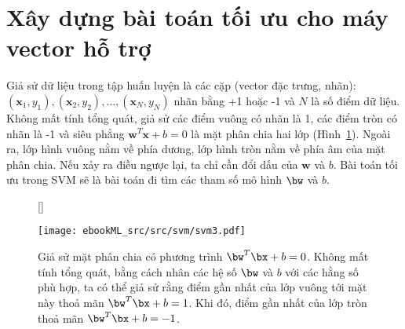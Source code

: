  
\section{Xây dựng bài toán tối ưu cho máy vector hỗ trợ} 
Giả sử dữ liệu trong tập huấn luyện là các cặp (vector đặc trưng, nhãn): $(\mathbf{x}_1, y_1),
(\mathbf{x}_2, y_2), \dots, (\mathbf{x}_N, y_N)$ 
{nhãn} bằng +1 hoặc -1 và $N$ là số điểm dữ liệu.
Không mất tính tổng quát, giả sử các điểm vuông có nhãn là 1, các điểm tròn có nhãn là -1 và siêu phẳng $\mathbf{w}^T\mathbf{x} + b  = 0$ là mặt phân chia hai lớp (Hình~\ref{fig:svmf3}). Ngoài ra, lớp hình vuông nằm về {phía
dương}, lớp hình tròn nằm về {phía âm} của mặt phân chia. Nếu  xảy ra điều ngược lại, ta
chỉ cần đổi dấu của $\mathbf{w}$ và $b$. Bài toán tối ưu trong SVM sẽ là bài toán đi tìm các tham số mô hình $\bw$ và $b$.
  \begin{figure}[t]
    [\FBwidth]
    {\caption{Giả sử mặt phân chia có phương trình $\bw^T\bx+b = 0$. Không mất
    tính tổng quát, bằng cách nhân các hệ số $\bw$ và $b$ với các hằng số phù
    hợp, ta có thể giả sử rằng điểm gần nhất của lớp vuông tới
    mặt này thoả mãn $\bw^T\bx + b = 1$. Khi đó, điểm gần nhất của lớp tròn
    thoả mãn $\bw^T\bx + b = -1$.}
    \label{fig:svmf3}}
    {\texttt{[image: ebookML\_src/src/svm/svm3.pdf]}}
\end{figure}

